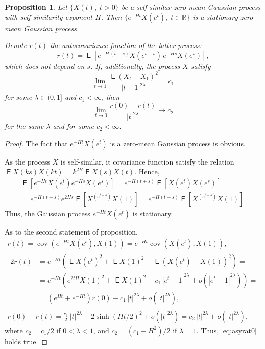 \documentclass{article}
\DeclareMathOperator{\ME}{\mathsf{E}}
\DeclareMathOperator{\cov}{cov}
\theoremstyle{plain}
\newtheorem{prop}{Proposition}
\begin{document}
\begin{prop}\label{prop:sstostat}
Let $\{X(t),\; t\mathbin{>}0\}$
be a self-similar zero-mean Gaussian process
with self-similarity exponent $H$.
Then
$\{e^{-Ht} X(e^t), \; t\mathbin{\in}\mathbb{R}\}$
is a stationary zero-mean Gaussian process.

Denote $r(t)$ the autocovariance function of the latter process:
\[
r(t) = \ME \left[e^{-H \, (t+s)} X(e^{t+s}) \, e^{-H s} X(e^s) \right],
\]
which does not depend on $s$.
If, additionally, the process $X$ satisfy
\[
\lim_{t\to 1} \frac{\ME(X_t - X_1)^2} {|t-1|^{2\lambda}} = c_1
\]
for some $\lambda\mathbin{\in}(0,1]$ and $c_1<\infty$,
then
\begin{equation}\label{eq:asyrat0}
\lim_{t\to 0} \frac{r(0) - r(t)}{|t|^{2\lambda}} \to c_2
\end{equation}
for the same $\lambda$ and for some $c_2<\infty$.
\end{prop}

\begin{proof}
The fact that $e^{-Ht} X(e^t)$ is a zero-mean Gaussian process is obvious.

As the process $X$ is self-similar,
it covariance function satisfy the relation
$\ME X(ks) X(kt) = k^{2H} \ME X(s) X(t)$.
Hence,
\begin{multline*}
\ME \left[ e^{-Ht} X(e^t) e^{-Hs} X(e^s) \right]
=
e^{-H(t+s)} \ME \left[X(e^t) X(e^s)\right]
= \\ =
e^{-H(t+s)} e^{2Hs} \ME \left[X^(e^{t-s}) X(1)\right]
=
e^{-H(t-s)} \ME \left[X^(e^{t-s}) X(1)\right] .
\end{multline*}
Thus, the Gaussian process $e^{-Ht} X(e^t)$ is stationary.

As to the second statement of proposition,
\begin{gather*}
r(t) = \cov(e^{-Ht} X(e^t), X(1)) = e^{-Ht} \cov(X(e^t),X(1)), \\
\begin{aligned}
2 r(t) &= e^{-Ht} \left(\ME X(e^t)^2 + \ME X(1)^2 - \ME(X(e^t)-X(1))^2\right)
= \\ &=
e^{-Ht} \left( e^{2tH} X(1)^2 + \ME X(1)^2 - c_1 \, |e^t - 1|^{2\lambda}
+ o(|e^t - 1|^{2\lambda}) \right)
= \\ &=
(e^{Ht} + e^{-Ht}) r(0) - c_1 \, |t|^{2\lambda} + o(|t|^{2\lambda}),
\end{aligned}\\
r(0) - r(t) = \frac{c_1}{2} \, |t|^{2\lambda} - 2 \sinh(Ht/2)^2 + o(|t|^{2\lambda})
= c_2 \, |t|^{2\lambda} + o(|t|^{2\lambda}),
\end{gather*}
where $c_2 = c_1/2$ if $0\mathbin{<}\lambda\mathbin{<}1$,
and $c_2 = (c_1 - H^2)/2$ if $\lambda=1$.
Thus, \eqref{eq:asyrat0} holds true.
\end{proof}
\end{document}
